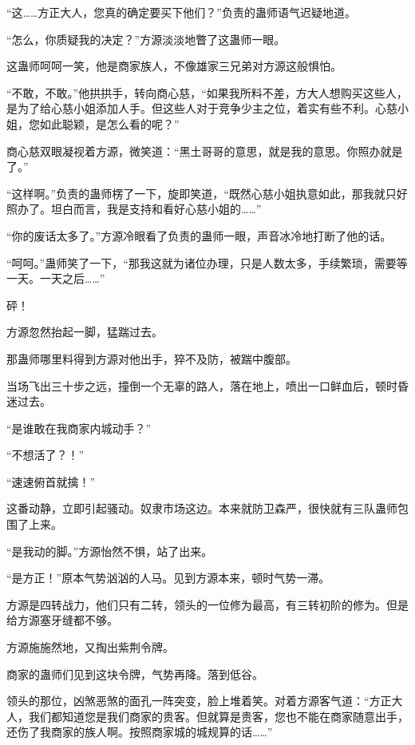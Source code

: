 
\begin{this_body}

“这……方正大人，您真的确定要买下他们？”负责的蛊师语气迟疑地道。

“怎么，你质疑我的决定？”方源淡淡地瞥了这蛊师一眼。

这蛊师呵呵一笑，他是商家族人，不像雄家三兄弟对方源这般惧怕。

“不敢，不敢。”他拱拱手，转向商心慈，“如果我所料不差，方大人想购买这些人，是为了给心慈小姐添加人手。但这些人对于竞争少主之位，着实有些不利。心慈小姐，您如此聪颖，是怎么看的呢？”

商心慈双眼凝视着方源，微笑道：“黑土哥哥的意思，就是我的意思。你照办就是了。”

“这样啊。”负责的蛊师楞了一下，旋即笑道，“既然心慈小姐执意如此，那我就只好照办了。坦白而言，我是支持和看好心慈小姐的……”

“你的废话太多了。”方源冷眼看了负责的蛊师一眼，声音冰冷地打断了他的话。

“呵呵。”蛊师笑了一下，“那我这就为诸位办理，只是人数太多，手续繁琐，需要等一天。一天之后……”

砰！

方源忽然抬起一脚，猛踹过去。

那蛊师哪里料得到方源对他出手，猝不及防，被踹中腹部。

当场飞出三十步之远，撞倒一个无辜的路人，落在地上，喷出一口鲜血后，顿时昏迷过去。

“是谁敢在我商家内城动手？”

“不想活了？！”

“速速俯首就擒！”

这番动静，立即引起骚动。奴隶市场这边。本来就防卫森严，很快就有三队蛊师包围了上来。

“是我动的脚。”方源怡然不惧，站了出来。

“是方正！”原本气势汹汹的人马。见到方源本来，顿时气势一滞。

方源是四转战力，他们只有二转，领头的一位修为最高，有三转初阶的修为。但是给方源塞牙缝都不够。

方源施施然地，又掏出紫荆令牌。

商家的蛊师们见到这块令牌，气势再降。落到低谷。

领头的那位，凶煞恶煞的面孔一阵突变，脸上堆着笑。对着方源客气道：“方正大人，我们都知道您是我们商家的贵客。但就算是贵客，您也不能在商家随意出手，还伤了我商家的族人啊。按照商家城的城规算的话……”


\end{this_body}
